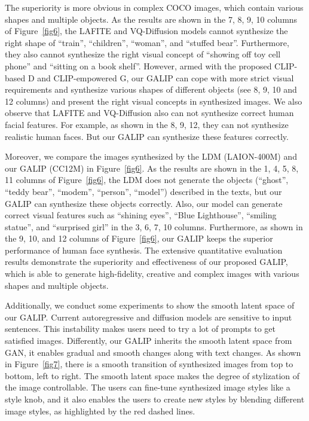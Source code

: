 \documentclass[10pt,twocolumn,letterpaper]{article}
\begin{document}
The superiority is more obvious in complex COCO images, which contain various shapes and multiple objects.
As the results are shown in the 7, 8, 9, 10 columns of Figure~\ref{fig6}, the LAFITE \cite{zhou2022towards} and VQ-Diffusion \cite{gu2022vector} models cannot synthesize the right shape of ``train'', ``children'', ``woman'', and ``stuffed bear''.
Furthermore, they also cannot synthesize the right visual concept of ``showing off toy cell phone'' and ``sitting on a book shelf''.
However, armed with the proposed CLIP-based D and CLIP-empowered G, our GALIP can cope with more strict visual requirements and synthesize various shapes of different objects (see 8, 9, 10 and 12 columns) and present the right visual concepts in synthesized images.
We also observe that LAFITE \cite{zhou2022towards} and VQ-Diffusion \cite{gu2022vector} also can not synthesize correct human facial features.
For example, as shown in the 8, 9, 12, they can not synthesize realistic human faces.
But our GALIP can synthesize these features correctly.

Moreover, we compare the images synthesized by the LDM (LAION-400M) \cite{rombach2022high,stablediff} and our GALIP (CC12M) in Figure~\ref{fig6}.
As the results are shown in the 1, 4, 5, 8, 11 columns of Figure~\ref{fig6},
the LDM does not generate the objects (``ghost'', ``teddy bear'', ``modem'', ``person'', ``model'') described in the texts,
but our GALIP can synthesize these objects correctly.
Also, our model can generate correct visual features such as ``shining eyes'', ``Blue Lighthouse'', ``smiling statue'', and ``surprised girl'' in the 3, 6, 7, 10 columns.
Furthermore, as shown in the 9, 10, and 12 columns of Figure~\ref{fig6}, our GALIP keeps the superior performance of human face synthesis.
The extensive quantitative evaluation results demonstrate the superiority and effectiveness of our proposed GALIP, which is able to generate high-fidelity, creative and complex images with various shapes and multiple objects.

Additionally, we conduct some experiments to show the smooth latent space of our GALIP.
Current autoregressive and diffusion models are sensitive to input sentences.
This instability makes users need to try a lot of prompts to get satisfied images.
Differently, our GALIP inherits the smooth latent space from GAN, it enables gradual and smooth changes along with text changes.
As shown in Figure~\ref{fig7}, there is a smooth transition of synthesized images from top to bottom, left to right. 
The smooth latent space makes the degree of stylization of the image controllable.
The users can fine-tune synthesized image styles like a style knob, and it also enables the users to create new styles by blending different image styles, as highlighted by the red dashed lines.
\end{document}
